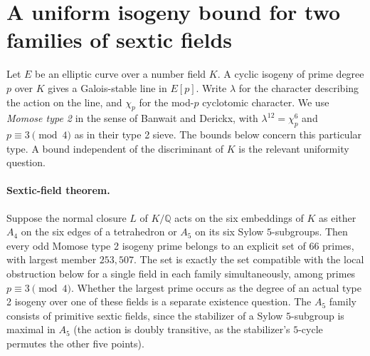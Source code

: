 \section{A uniform isogeny bound for two families of sextic fields}
\label{sec:sextic}

Let $E$ be an elliptic curve over a number field $K$. A cyclic isogeny of
prime degree $p$ over $K$ gives a Galois-stable line in $E[p]$. Write
$\lambda$ for the character describing the action on the line, and $\chi_p$
for the mod-$p$ cyclotomic character. We use \emph{Momose type 2} in the
sense of Banwait and Derickx, with $\lambda^{12}=\chi_p^6$ and
$p\equiv3\pmod4$ as in their type 2 sieve. The bounds below concern this
particular type. A bound independent of the discriminant of $K$ is the
relevant uniformity question.

\paragraph{Sextic-field theorem.}
Suppose the normal closure $L$ of $K/\mathbb Q$ acts on the six embeddings
of $K$ as either
$A_4$ on the six edges of a tetrahedron or $A_5$ on its six Sylow
$5$-subgroups. Then every odd Momose type 2 isogeny prime belongs to an
explicit set of $66$ primes, with largest member $253{,}507$. The set
is exactly the set compatible with the local obstruction below for a single field in each family simultaneously, among primes $p\equiv3\pmod4$. Whether the largest prime occurs as
the degree of an actual type 2 isogeny over one of these fields is a separate
existence question. The $A_5$ family consists of primitive sextic fields,
since the stabilizer of a Sylow $5$-subgroup is maximal in $A_5$ (the action
is doubly transitive, as the stabilizer's $5$-cycle permutes the other
five points).


